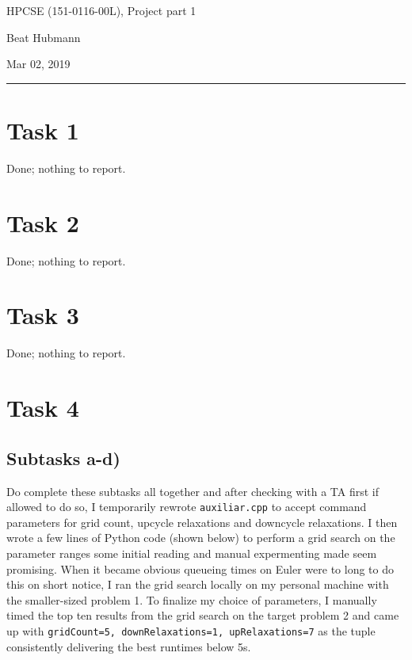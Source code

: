 \documentclass[11pt,a4paper]{article}
\begin{document}
\noindent\parbox{\linewidth}{
 \parbox{.25\linewidth}{ \large HPCSE (151-0116-00L), Project part 1}\hfill
 \parbox{.5\linewidth}{\begin{center} \large Beat Hubmann \end{center}}\hfill
 \parbox{.2\linewidth}{\begin{flushright} \large Mar 02, 2019 \end{flushright}}
}
\noindent\rule{\linewidth}{2pt}

\section{Task 1}
Done; nothing to report.

\section{Task 2}
Done; nothing to report.

\section{Task 3}
Done; nothing to report.

\section{Task 4}
\subsection{Subtasks a-d)}
Do complete these subtasks all together and after checking with a TA first if allowed to do so, I temporarily rewrote
\texttt{auxiliar.cpp} to accept command parameters for grid count, upcycle relaxations and downcycle
relaxations. I then wrote a few lines of Python code (shown below) to perform a 
grid search on the parameter ranges some initial reading and manual expermenting made
seem promising. When it became obvious queueing times on Euler were to long to do this
on short notice, I ran the grid search locally on my personal machine with the smaller-sized problem 1.
To finalize my choice of parameters, I manually timed the top ten results from the grid search on the target problem 2 and
came up with \texttt{gridCount=5, downRelaxations=1, upRelaxations=7} as the 
tuple consistently delivering the best runtimes below 5s.
\end{document}

